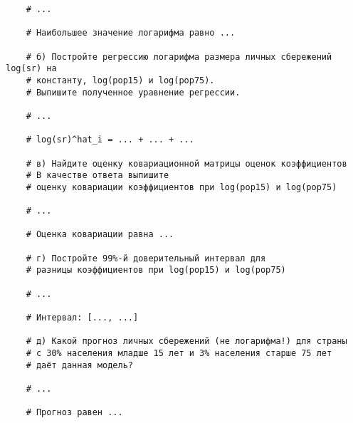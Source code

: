 \documentclass[12pt]{article}
\begin{document}
\begin{enumerate}
\begin{verbatim}
    # ...

    # Наибольшее значение логарифма равно ... 

    # б) Постройте регрессию логарифма размера личных сбережений log(sr) на 
    # константу, log(pop15) и log(pop75).
    # Выпишите полученное уравнение регрессии. 

    # ...

    # log(sr)^hat_i = ... + ... + ... 

    # в) Найдите оценку ковариационной матрицы оценок коэффициентов
    # В качестве ответа выпишите  
    # оценку ковариации коэффициентов при log(pop15) и log(pop75)

    # ... 

    # Оценка ковариации равна ...

    # г) Постройте 99%-й доверительный интервал для 
    # разницы коэффициентов при log(pop15) и log(pop75)

    # ...

    # Интервал: [..., ...]

    # д) Какой прогноз личных сбережений (не логарифма!) для страны 
    # с 30% населения младше 15 лет и 3% населения старше 75 лет 
    # даёт данная модель?
    
    # ...

    # Прогноз равен ...
\end{verbatim}



\end{enumerate}
\end{document}

